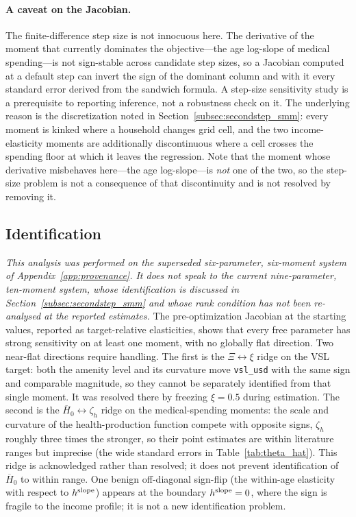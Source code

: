 \documentclass[12pt,a4paper]{article}
\begin{document}
\begin{appendices}
\paragraph{A caveat on the Jacobian.} The finite-difference step size is not innocuous here. The derivative of the moment that currently dominates the objective---the age log-slope of medical spending---is not sign-stable across candidate step sizes, so a Jacobian computed at a default step can invert the sign of the dominant column and with it every standard error derived from the sandwich formula. A step-size sensitivity study is a prerequisite to reporting inference, not a robustness check on it. The underlying reason is the discretization noted in Section~\ref{subsec:secondstep_smm}: every moment is kinked where a household changes grid cell, and the two income-elasticity moments are additionally discontinuous where a cell crosses the spending floor at which it leaves the regression. Note that the moment whose derivative misbehaves here---the age log-slope---is \emph{not} one of the two, so the step-size problem is not a consequence of that discontinuity and is not resolved by removing it.

\subsection{Identification}
\label{app:identification}

\emph{This analysis was performed on the superseded six-parameter, six-moment system of Appendix~\ref{app:provenance}. It does not speak to the current nine-parameter, ten-moment system, whose identification is discussed in Section~\ref{subsec:secondstep_smm} and whose rank condition has not been re-analysed at the reported estimates.} The pre-optimization Jacobian at the starting values, reported as target-relative elasticities, shows that every free parameter has strong sensitivity on at least one moment, with no globally flat direction. Two near-flat directions require handling. The first is the $\Xi\leftrightarrow\xi$ ridge on the VSL target: both the amenity level and its curvature move \texttt{vsl\_usd} with the same sign and comparable magnitude, so they cannot be separately identified from that single moment. It was resolved there by freezing $\xi=0.5$ during estimation. The second is the $\overline{H}_0\leftrightarrow\zeta_h$ ridge on the medical-spending moments: the scale and curvature of the health-production function compete with opposite signs, $\zeta_h$ roughly three times the stronger, so their point estimates are within literature ranges but imprecise (the wide standard errors in Table~\ref{tab:theta_hat}). This ridge is acknowledged rather than resolved; it does not prevent identification of $\overline{H}_0$ to within range. One benign off-diagonal sign-flip (the within-age elasticity with respect to $h^{\rm slope}$) appears at the boundary $h^{\rm slope}=0$, where the sign is fragile to the income profile; it is not a new identification problem.


\end{appendices}
\end{document}
